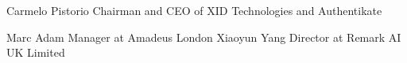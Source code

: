 
\begin{cvskills}
\cvskill
  {Carmelo Pistorio} %
  {Chairman and CEO of XID Technologies and Authentikate} %

\cvskill
    {Marc Adam} %
    {Manager at Amadeus London}  %
\cvskill
    {Xiaoyun Yang} %
    {Director at Remark AI UK Limited}  %
\end{cvskills}